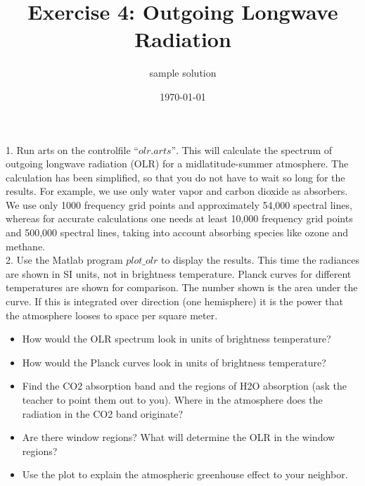 \documentclass[paper=a4, fontsize=11pt]{scrartcl} %
\title{ Exercise 4: Outgoing Longwave Radiation}
\author{sample solution}
\date{\normalsize\today}
\begin{document}
\maketitle

1. Run arts on the controlfile $“olr.arts”$. This will calculate the spectrum of outgoing 
longwave radiation (OLR) for a midlatitude-summer atmosphere. The calculation has been simplified, 
so that you do not have to wait so long for the results. For example, we use only water vapor and 
carbon dioxide as absorbers. We use only 1000 frequency grid points and approximately 54,000 spectral 
lines, whereas for accurate calculations one needs at least 10,000 frequency grid points and 500,000 
spectral lines, taking into account absorbing species like ozone and methane.\ \\

2. Use the Matlab program $plot\_olr$ to display the results. This time the radiances 
are shown in SI units, not in brightness temperature.  Planck curves for different temperatures are 
shown for comparison. The number shown is the area under the curve. If this is integrated over 
direction (one hemisphere) it is the power that the atmosphere looses to space per square meter. \ \\

\begin{itemize}
	\item How would the OLR spectrum look in units of brightness temperature?
	\item How would the Planck curves look in units of brightness temperature?
	\item Find the CO2 absorption band and the regions of H2O absorption (ask the teacher 
	    to point them out to you). Where in the atmosphere does the radiation in the CO2 band originate? 
	\item Are there window regions? What will determine the OLR in the window regions?
	\item Use the plot to explain the atmospheric greenhouse effect to your neighbor. \ \\
\end{itemize}
\end{document}
